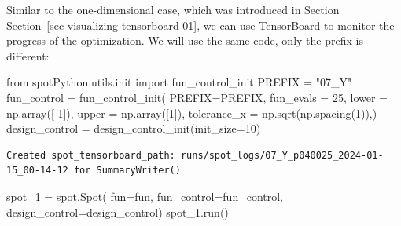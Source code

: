 \documentclass[
  letterpaper,
  DIV=11,
  numbers=noendperiod]{scrreprt}
\newenvironment{Shaded}{\begin{snugshade}}{\end{snugshade}}
\newcommand{\DecValTok}[1]{\textcolor[rgb]{0.68,0.00,0.00}{#1}}
\newcommand{\ImportTok}[1]{\textcolor[rgb]{0.00,0.46,0.62}{#1}}
\newcommand{\NormalTok}[1]{\textcolor[rgb]{0.00,0.23,0.31}{#1}}
\newcommand{\OperatorTok}[1]{\textcolor[rgb]{0.37,0.37,0.37}{#1}}
\newcommand{\StringTok}[1]{\textcolor[rgb]{0.13,0.47,0.30}{#1}}
\begin{document}
\begin{tcolorbox}[enhanced jigsaw, rightrule=.15mm, coltitle=black, title=\textcolor{quarto-callout-note-color}{\faInfo}\hspace{0.5em}{TensorBoard}, opacitybacktitle=0.6, bottomrule=.15mm, opacityback=0, left=2mm, colback=white, leftrule=.75mm, colframe=quarto-callout-note-color-frame, colbacktitle=quarto-callout-note-color!10!white, toprule=.15mm, toptitle=1mm, bottomtitle=1mm, titlerule=0mm, breakable, arc=.35mm]

Similar to the one-dimensional case, which was introduced in Section
Section~\ref{sec-visualizing-tensorboard-01}, we can use TensorBoard to
monitor the progress of the optimization. We will use the same code,
only the prefix is different:

\begin{Shaded}
\begin{Highlighting}[]
\ImportTok{from}\NormalTok{ spotPython.utils.init }\ImportTok{import}\NormalTok{ fun\_control\_init}
\NormalTok{PREFIX }\OperatorTok{=} \StringTok{"07\_Y"}
\NormalTok{fun\_control }\OperatorTok{=}\NormalTok{ fun\_control\_init(}
\NormalTok{    PREFIX}\OperatorTok{=}\NormalTok{PREFIX,}
\NormalTok{    fun\_evals }\OperatorTok{=} \DecValTok{25}\NormalTok{,}
\NormalTok{    lower }\OperatorTok{=}\NormalTok{ np.array([}\OperatorTok{{-}}\DecValTok{1}\NormalTok{]),}
\NormalTok{    upper }\OperatorTok{=}\NormalTok{ np.array([}\DecValTok{1}\NormalTok{]),}
\NormalTok{    tolerance\_x }\OperatorTok{=}\NormalTok{ np.sqrt(np.spacing(}\DecValTok{1}\NormalTok{)),)}
\NormalTok{design\_control }\OperatorTok{=}\NormalTok{ design\_control\_init(init\_size}\OperatorTok{=}\DecValTok{10}\NormalTok{)}
\end{Highlighting}
\end{Shaded}

\begin{verbatim}
Created spot_tensorboard_path: runs/spot_logs/07_Y_p040025_2024-01-15_00-14-12 for SummaryWriter()
\end{verbatim}

\end{tcolorbox}

\begin{Shaded}
\begin{Highlighting}[]
\NormalTok{spot\_1 }\OperatorTok{=}\NormalTok{ spot.Spot(}
\NormalTok{            fun}\OperatorTok{=}\NormalTok{fun,}
\NormalTok{            fun\_control}\OperatorTok{=}\NormalTok{fun\_control,}
\NormalTok{            design\_control}\OperatorTok{=}\NormalTok{design\_control)}
\NormalTok{spot\_1.run()}
\end{Highlighting}
\end{Shaded}
\end{document}
